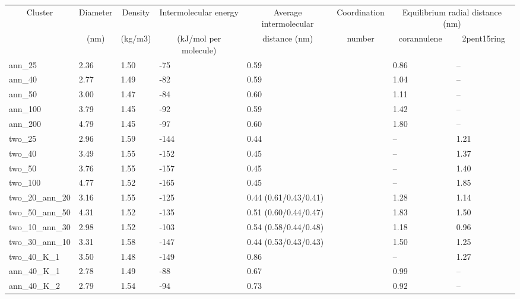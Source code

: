 %
\begin{table}[]
\label{table:maintable}
\begin{tabular}{l|l|l|l|l|l|ll}
\hline
\multicolumn{1}{c|}{\multirow{2}{*}{Cluster}} & \multicolumn{1}{c|}{Diameter} & \multicolumn{1}{c|}{Density} & \multicolumn{1}{c|}{Intermolecular energy} & \multicolumn{1}{c|}{Average intermolecular} & \multicolumn{1}{c|}{Coordination} & \multicolumn{2}{c}{Equilibrium radial distance (nm)} \\ \cline{7-8} 
\multicolumn{1}{c|}{} & \multicolumn{1}{c|}{(nm)} & \multicolumn{1}{c|}{(kg/m3)} & \multicolumn{1}{c|}{(kJ/mol per molecule)} & \multicolumn{1}{c|}{distance (nm)} & \multicolumn{1}{c|}{number} & \multicolumn{1}{c|}{corannulene} & \multicolumn{1}{c}{2pent15ring} \\ \hline
ann\_25 & 2.36 & 1.50 & -75 & 0.59 &  & \multicolumn{1}{l|}{0.86} & -- \\
ann\_40 & 2.77 & 1.49 & -82 & 0.59 &  & \multicolumn{1}{l|}{1.04} & -- \\
ann\_50 & 3.00 & 1.47 & -84 & 0.60 &  & \multicolumn{1}{l|}{1.11} & -- \\
ann\_100 & 3.79 & 1.45 & -92 & 0.59 &  & \multicolumn{1}{l|}{1.42} & -- \\
ann\_200 & 4.79 & 1.45 & -97 & 0.60 &  & \multicolumn{1}{l|}{1.80} & -- \\
two\_25 & 2.96 & 1.59 & -144 & 0.44 &  & \multicolumn{1}{l|}{--} & 1.21 \\
two\_40 & 3.49 & 1.55 & -152 & 0.45 &  & \multicolumn{1}{l|}{--} & 1.37 \\
two\_50 & 3.76 & 1.55 & -157 & 0.45 &  & \multicolumn{1}{l|}{--} & 1.40 \\
two\_100 & 4.77 & 1.52 & -165 & 0.45 &  & \multicolumn{1}{l|}{--} & 1.85 \\
two\_20\_ann\_20 & 3.16 & 1.55 & -125 & 0.44 (0.61/0.43/0.41) &  & \multicolumn{1}{l|}{1.28} & 1.14 \\
two\_50\_ann\_50 & 4.31 & 1.52 & -135 & 0.51 (0.60/0.44/0.47) &  & \multicolumn{1}{l|}{1.83} & 1.50 \\
two\_10\_ann\_30 & 2.98 & 1.52 & -103 & 0.54 (0.58/0.44/0.48) &  & \multicolumn{1}{l|}{1.18} & 0.96 \\
two\_30\_ann\_10 & 3.31 & 1.58 & -147 & 0.44 (0.53/0.43/0.43) &  & \multicolumn{1}{l|}{1.50} & 1.25 \\
two\_40\_K\_1 & 3.50 & 1.48 & -149 & 0.86 &  & \multicolumn{1}{l|}{--} & 1.27 \\
ann\_40\_K\_1 & 2.78 & 1.49 & -88 & 0.67 &  & \multicolumn{1}{l|}{0.99} & -- \\
ann\_40\_K\_2 & 2.79 & 1.54 & -94 & 0.73 &  & \multicolumn{1}{l|}{0.92} & -- \\ \hline
\end{tabular}
\end{table}



